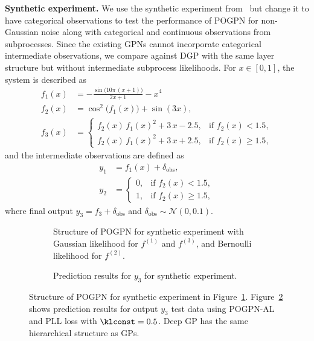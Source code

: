 \textbf{Synthetic experiment.} We use the synthetic experiment from~\cite{requeima2019gaussian} but change it to have categorical observations to test the performance of POGPN for non-Gaussian noise along with categorical and continuous observations from subprocesses. Since the existing GPNs cannot incorporate categorical intermediate observations, we compare against DGP with the same layer structure but without intermediate subprocess likelihoods. For $x\in[0, 1]$, the system is described as
\begin{align*}
      f_{1}(x)
       & = -\frac{\sin\!\bigl(10\pi\,(x + 1)\bigr)}{2x + 1} - x^{4}           \\
      f_{2}(x)
       & = \cos^{2}\!\bigl(f_{1}(x)\bigr) + \sin(3x),                         \\
      f_{3}(x)
       & =\begin{cases}
                f_{2}(x)\,f_{1}(x)^{2} + 3\,x - 2.5, & \text{if } f_{2}(x) < 1.5,   \\
                f_{2}(x)\,f_{1}(x)^{2} + 3\,x + 2.5, & \text{if } f_{2}(x) \ge 1.5,
          \end{cases}
\end{align*}
and the intermediate observations are defined as
\begin{align*}
      y_{1} & = f_{1}(x) + \delta_{\text{obs}}, \\
      y_{2} & =
      \begin{cases}
            0, & \text{if } f_{2}(x) < 1.5,   \\
            1, & \text{if } f_{2}(x) \ge 1.5,
      \end{cases}
\end{align*}
where final output $y_3=f_3 + \delta_{\text{obs}}$ and $\delta_{\text{obs}} \sim \mathcal{N}(0, 0.1)$.
\begin{figure}[ht]
      \centering
      \begin{subfigure}[t]{\columnwidth}
            \centering
            
            \caption{Structure of POGPN for synthetic experiment with Gaussian likelihood for $f^{(1)}$ and $f^{(3)}$, and Bernoulli likelihood for $f^{(2)}$.}
            \label{fig:synthetic_dag}
      \end{subfigure}
      \hfill
      \begin{subfigure}[t]{\columnwidth}
            \centering
            
            \caption{Prediction results for $y_3$ for synthetic experiment.}
            \label{fig:synthetic_pred}
      \end{subfigure}
      \caption{Structure of POGPN for synthetic experiment in Figure~\ref{fig:synthetic_dag}. Figure~\ref{fig:synthetic_pred} shows prediction results for output $y_3$ test data using POGPN-AL and PLL loss with $\klconst=0.5$. Deep GP has the same hierarchical structure as GPs.} %
      \label{fig:synthetic_combined} %
      \vspace{-1em}
\end{figure}


